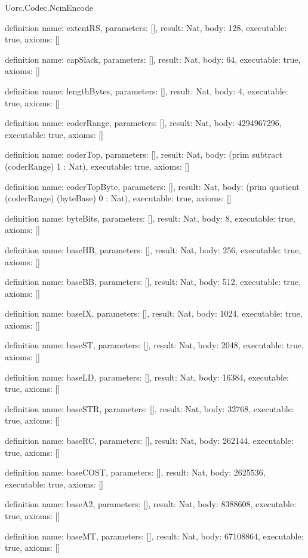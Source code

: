 \begin{lexlean}{Uorc.Codec.NcmEncode}
\begin{semanticmodule}
definition{
  name: extentRS,
  parameters: [],
  result: Nat,
  body: 128,
  executable: true,
  axioms: []
}

definition{
  name: capSlack,
  parameters: [],
  result: Nat,
  body: 64,
  executable: true,
  axioms: []
}

definition{
  name: lengthBytes,
  parameters: [],
  result: Nat,
  body: 4,
  executable: true,
  axioms: []
}

definition{
  name: coderRange,
  parameters: [],
  result: Nat,
  body: 4294967296,
  executable: true,
  axioms: []
}

definition{
  name: coderTop,
  parameters: [],
  result: Nat,
  body: (prim subtract (coderRange) 1 : Nat),
  executable: true,
  axioms: []
}

definition{
  name: coderTopByte,
  parameters: [],
  result: Nat,
  body: (prim quotient (coderRange) (byteBase) 0 : Nat),
  executable: true,
  axioms: []
}

definition{
  name: byteBits,
  parameters: [],
  result: Nat,
  body: 8,
  executable: true,
  axioms: []
}

definition{
  name: baseHB,
  parameters: [],
  result: Nat,
  body: 256,
  executable: true,
  axioms: []
}

definition{
  name: baseBB,
  parameters: [],
  result: Nat,
  body: 512,
  executable: true,
  axioms: []
}

definition{
  name: baseIX,
  parameters: [],
  result: Nat,
  body: 1024,
  executable: true,
  axioms: []
}

definition{
  name: baseST,
  parameters: [],
  result: Nat,
  body: 2048,
  executable: true,
  axioms: []
}

definition{
  name: baseLD,
  parameters: [],
  result: Nat,
  body: 16384,
  executable: true,
  axioms: []
}

definition{
  name: baseSTR,
  parameters: [],
  result: Nat,
  body: 32768,
  executable: true,
  axioms: []
}

definition{
  name: baseRC,
  parameters: [],
  result: Nat,
  body: 262144,
  executable: true,
  axioms: []
}

definition{
  name: baseCOST,
  parameters: [],
  result: Nat,
  body: 2625536,
  executable: true,
  axioms: []
}

definition{
  name: baseA2,
  parameters: [],
  result: Nat,
  body: 8388608,
  executable: true,
  axioms: []
}

definition{
  name: baseMT,
  parameters: [],
  result: Nat,
  body: 67108864,
  executable: true,
  axioms: []
}


\end{semanticmodule}
\end{lexlean}
